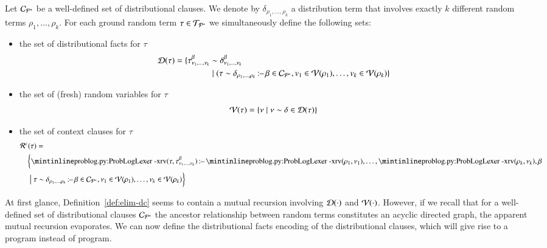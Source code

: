 \begin{definition}\label{def:elim-dc}
	Let $\mathcal{C}_{{{\mathcal{P}}^{*}}}$ be a well-defined set of distributional clauses.
	We denote by $\delta_{\rho_1, \dots, \rho_k}$ a distribution term that involves exactly $k$ different random terms $\rho_1,\ldots,\rho_k$.
	For each ground random term $\tau\in \mathcal{T}_{{{\mathcal{P}}^{*}}}$ we simultaneously define the following sets:
	\begin{itemize}
		\item the set of distributional facts for $\tau$
		      \begin{align*}
			      \mathcal{D}(\tau) =
			      \{
			      \tau^\beta_{\nu_1,\ldots,\nu_k}
			       & \sim \delta^\beta_{\nu_1,\ldots,\nu_k}
			      \\
			       & \mid
			      (\tau \sim \delta_{\rho_1,\ldots,\rho_k} \operatorname*{\mathtt{{:}{\---}}} \beta \in \mathcal{C}_{{\mathcal{P}}^{*}}
			      ,
			      v_1\in \mathcal{V}(\rho_1), \ldots, v_k\in \mathcal{V}(\rho_k)
			      \}
		      \end{align*}
		\item    the set of (fresh) random variables for $\tau$
		      \begin{equation*}
			      \mathcal{V}(\tau) = \{\nu \mid \nu\sim \delta \in \mathcal{D}(\tau)\}
		      \end{equation*}
		\item the set of context clauses for $\tau$
		      \begin{align*}
			       & \logicprogram^{c}(\tau)
			      =
			      \\
			       &
			      \quad \biggl\{\text{\probloginline{rv}}(\tau,\tau^\beta_{\nu_1,\ldots,\nu_k})
			      \lpif
			      \text{\probloginline{rv}}(\rho_1,\nu_1),\ldots,\text{\probloginline{rv}}(\rho_k,\nu_k), \beta
			      \\
			       &
			      \quad \bigm|
			      \tau \sim \delta_{\rho_1,\ldots,\rho_k} \lpif \beta \in \dclauses_{\adfreeprogram}, \nu_1\in \randomvariableset(\rho_1), \ldots, \nu_k\in \randomvariableset(\rho_k)
			      \biggr\}
		      \end{align*}
	\end{itemize}
\end{definition}

At first glance, Definition~\ref{def:elim-dc} seems to contain a mutual recursion involving $\mathcal{D}(\cdot)$ and $\mathcal{V}(\cdot)$.
However, if we recall that for a well-defined set of distributional clauses $\mathcal{C}_{{\mathcal{P}}^{*}}$ the ancestor relationship between random terms constitutes an acyclic directed graph, the apparent mutual recursion evaporates. We can now define the distributional facts encoding of the distributional clauses, which will give rise to a \dfplpsty program instead of \dcproblogsty program.

